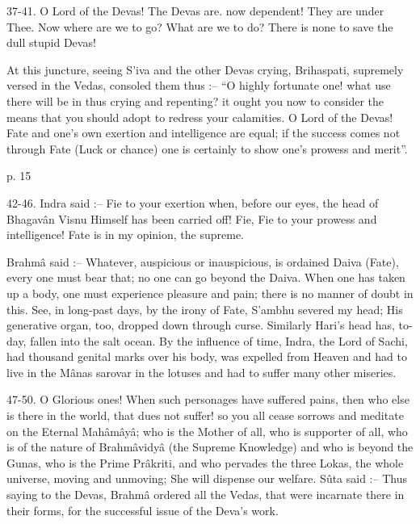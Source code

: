  

37-41. O Lord of the Devas! The Devas are. now dependent! They are under Thee. Now where are we to go? What are we to do? There is none to save the dull stupid Devas!

 

 At this juncture, seeing S’iva and the other Devas crying, Brihaspati, supremely versed in the Vedas, consoled them thus :-- “O highly fortunate one! what use there will be in thus crying and repenting? it ought you now to consider the means that you should adopt to redress your calamities. O Lord of the Devas! Fate and one's own exertion and intelligence are equal; if the success comes not through Fate (Luck or chance) one is certainly to show one's prowess and merit”.

 

p. 15

 

42-46. Indra said :-- Fie to your exertion when, before our eyes, the head of Bhagavân Visnu Himself has been carried off! Fie, Fie to your prowess and intelligence! Fate is in my opinion, the supreme.

 

Brahmâ said :-- Whatever, auspicious or inauspicious, is ordained Daiva (Fate), every one must bear that; no one can go beyond the Daiva. When one has taken up a body, one must experience pleasure and pain; there is no manner of doubt in this. See, in long-past days, by the irony of Fate, S’ambhu severed my head; His generative organ, too, dropped down through curse. Similarly Hari's head has, to-day, fallen into the salt ocean. By the influence of time, Indra, the Lord of Sachi, had thousand genital marks over his body, was expelled from Heaven and had to live in the Mânas sarovar in the lotuses and had to suffer many other miseries.

 

47-50. O Glorious ones! When such personages have suffered pains, then who else is there in the world, that dues not suffer! so you all cease sorrows and meditate on the Eternal Mahâmâyâ; who is the Mother of all, who is supporter of all, who is of the nature of Brahmâvidyâ (the Supreme Knowledge) and who is beyond the Gunas, who is the Prime Prâkriti, and who pervades the three Lokas, the whole universe, moving and unmoving; She will dispense our welfare. Sûta said :-- Thus saying to the Devas, Brahmâ ordered all the Vedas, that were incarnate there in their forms, for the successful issue of the Deva's work.

